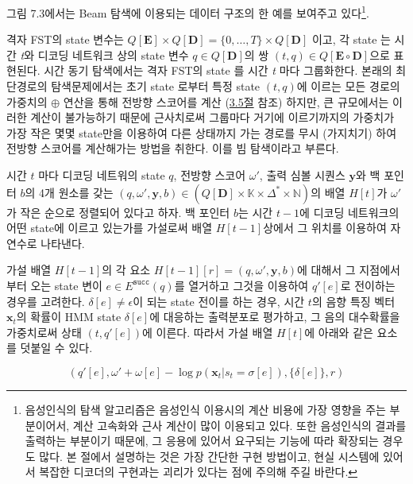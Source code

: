 \documentclass[../main.tex]{subfiles}
\begin{document}
그림 7.3에서는 Beam 탐색에 이용되는 데이터 구조의 한 예를 보여주고 있다\footnote{음성인식의 탐색 알고리즘은 음성인식 이용시의 계산 비용에 가장 영향을 주는 부분이어서, 계산 고속화와 근사 계산이 많이 이용되고 있다. 또한 음성인식의 결과를 출력하는 부분이기 때문에, 그 응용에 있어서 요구되는 기능에 따라 확장되는 경우도 많다. 본 절에서 설명하는 것은 가장 간단한 구현 방법이고, 현실 시스템에 있어서 복잡한 디코더의 구현과는 괴리가 있다는 점에 주의해 주길 바란다.}. 

격자 FST의 state 변수는 $ Q [ \bm{E} ] \times Q [ \bm{D} ] = \{ 0, \ldots , T\} \times Q [ \bm{D} ] $ 이고, 각 state 는 시간 \textit{t}와 디코딩 네트워크 상의 state 변수 $ q \in Q [ \bm{D} ] $의 쌍 $(t,q) \in Q [ \bm{E} \circ \bm{D} ] $으로 표현된다. 
시간 동기 탐색에서는 격자 FST의 state 를 시간 \textit{t} 마다 그룹화한다. 
본래의 최단경로의 탐색문제에서는 초기 state 로부터 특정 state $(t,q)$에 이르는 모든 경로의 가중치의 $\oplus$ 연산을 통해 전방향 스코어를 계산 (\hyperref[sec:shortest-path]{3.5절} 참조) 하지만, 
큰 규모에서는 이러한 계산이 불가능하기 때문에 근사치로써 그룹마다 거기에 이르기까지의 가중치가 가장 작은 몇몇 state만을 이용하여 다른 상태까지 가는 경로를 무시 (가지치기) 하여 전방향 스코어를 계산해가는 방법을 취한다. 
이를 빔 탐색이라고 부른다. 

시간 $t$ 마다 디코딩 네트워의 state $q$, 전방향 스코어 $\omega'$, 출력 심볼 시퀀스 $\bm{y}$와 백 포인터 $b$의 4개 원소를 갖는 $(q, \omega', \bm{y}, b) \in (Q[\bm{D}] \times \mathbb{K} \times \Delta^{*} \times \mathbb{N} )$의 배열 $H[t]$가 $\omega'$가 작은 순으로 정렬되어 있다고 하자. 
백 포인터 $b$는 시간 $t-1$에 디코딩 네트워크의 어떤 state에 이르고 있는가를 가설로써 배열 $H[t-1]$상에서 그 위치를 이용하여 자연수로 나타낸다. 

가설 배열 $H[t-1]$의 각 요소 $H[t-1][r] = (q, \omega', \bm{y}, b)$에 대해서 그 지점에서부터 오는 state 변이 $e \in E^{\mathtt{succ}}(q)$를 열거하고 그것을 이용하여 $q'[e]$로 전이하는 경우를 고려한다. 
$\delta[e] \neq \epsilon$이 되는 state 전이를 하는 경우, 시간 $t$의 음향 특징 벡터 $\bm{x}_t$의 확률이 HMM state $\delta[e]$에 대응하는 출력분포로 평가하고, 그 음의 대수확률을 가중치로써 상태 $(t, q'[e])$에 이른다. 
따라서 가설 배열 $H[t]$에 아래와 같은 요소를 덧붙일 수 있다. 

\begin{equation}
    (q'[e], \omega' + \omega[e] - \log p(\bm{x}_t | s_t = \sigma[e]), \{\delta[e]\}, r)
\end{equation}
\end{document}
